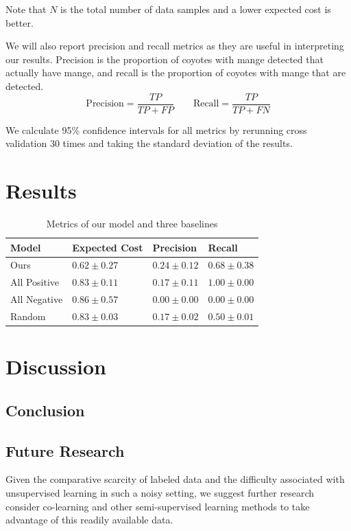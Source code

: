 \documentclass{article}
\begin{document}
Note that $N$ is the total number of data samples and a lower expected cost is
better.

We will also report precision and recall metrics as they are useful in
interpreting our results. Precision is the proportion of coyotes with mange
detected that actually have mange, and recall is the proportion of coyotes with
mange that are detected.
\begin{equation}
  \text{Precision} = \frac{TP}{TP+FP} \qquad \text{Recall} = \frac{TP}{TP+FN}
\end{equation}

We calculate 95\% confidence intervals for all metrics by rerunning cross
validation 30 times and taking the standard deviation of the results.

\section{Results} \label{sec:results}

\begin{table}[h!]
  \caption{Metrics of our model and three baselines}
  \label{results}
  \centering
  \begin{tabular}{llll}
    \topfigrule
    Model     & Expected Cost     & Precision & Recall \\
    \midrule
    Ours & $\mathbf{0.62} \pm 0.27$ & $\mathbf{0.24} \pm 0.12$ & $0.68 \pm 0.38$     \\
    All Positive & $0.83 \pm 0.11$    & $0.17 \pm 0.11$ & $\mathbf{1.00} \pm 0.00$     \\
    All Negative & $0.86 \pm 0.57$    & $0.00 \pm 0.00$ & $0.00 \pm 0.00$     \\
    Random & $0.83 \pm 0.03$    & $0.17 \pm 0.02$ & $0.50 \pm 0.01$     \\
    \bottomrule
  \end{tabular}
\end{table}

\section{Discussion} \label{sec:discussion}

\subsection{Conclusion}\label{sec:conclusion}

\subsection{Future Research}
Given the comparative scarcity of labeled data and the difficulty associated
with unsupervised learning in such a noisy setting, we suggest further research
consider co-learning and other semi-supervised learning methods to take
advantage of this readily available data.
\end{document}

